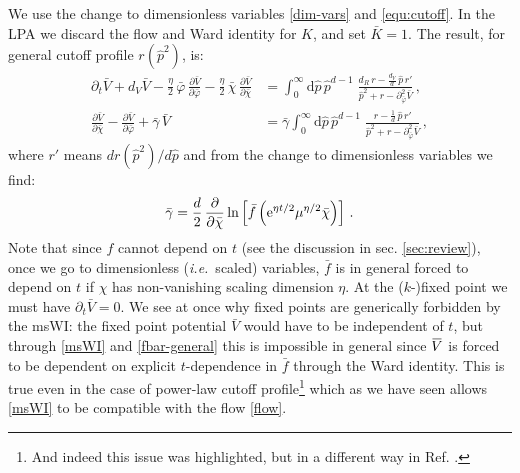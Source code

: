 \documentclass[11pt]{book}
\newcommand{\overbar}[1]{\mkern 1.5mu\overline{\mkern-1.5mu#1\mkern-1.5mu}\mkern 1.5mu}
\newcommand{\bV}{\overbar V}
\newcommand\ie{\textit{i.e.}\ }
\newcommand{\bc}{\bar \chi}
\numberwithin{equation}{chapter}
\begin{document}
We use the change to dimensionless variables \eqref{dim-vars} and \eqref{equ:cutoff}.
In the LPA we discard the flow and Ward identity for $K$, and set $\bar K=1$.
The result, for general cutoff profile $r(\hat{p}^2)$, is:
\begin{align}
  \label{flow}
  \partial_t \bar V + d_V \bar V - \frac{\eta}{2} \, \bar\varphi \, \frac{\partial \bar V}{\partial \bar\varphi} - \frac{\eta}{2} \, \bar\chi \, \frac{\partial \bar V}{\partial \bar\chi} &=
  \int_0^{\infty} \mathrm d\hat p \, \hat p^{d-1} \; \frac{d_R\, r - \frac{d_V}{d} \, \hat p \, r'}{\hat p^2 + r - \partial^2_{\bar\varphi}\bar V}\,,\\
  \label{msWI}
  \frac{\partial \bar V}{\partial \bar\chi} - \frac{\partial \bar V}{\partial \bar\varphi} + \bar \gamma \, \bar V &= \bar \gamma
  \int_0^{\infty} \mathrm d\hat p \, \hat p^{d-1} \; \frac{r - \frac{1}{d} \, \hat p \, r'}{\hat p^2 + r - \partial^2_{\bar\varphi}\bar V} \,,
\end{align}
where $r'$ means $dr(\hat{p}^2)/d\hat{p}$ and from the change to dimensionless variables we find:
\begin{align}
  \label{fbar-general}
  \bar{\gamma} = \frac{d}{2} \, \frac{\partial}{\partial\bc}\ln
  \left[
    \bar{f}\left({\rm e}^{\eta t/2}\mu^{\eta/2}\bc\right)
  \right]\,.
\end{align}
Note that since $f$ cannot depend on $t$ (see the discussion in sec. \ref{sec:review}),
once we go to dimensionless (\ie scaled) variables, $\bar{f}$ is in general forced to depend on
$t$ if $\chi$ has non-vanishing scaling dimension $\eta$.
At the ($k$-)fixed point we must have $\partial_t \bar V = 0$. We see at once why fixed points are
generically forbidden by the msWI: the fixed point potential $\bar{V}$ would have to be independent of $t$,
but through \eqref{msWI} and \eqref{fbar-general} this is impossible in general since $\bV$ is forced
to be dependent on explicit $t$-dependence in $\bar{f}$ through the Ward identity.
This is true even in the case of power-law cutoff profile\footnote{And indeed this issue was highlighted,
but in a different way in Ref. \cite{Dietz:2015owa}.} which as we have seen allows \eqref{msWI} to be
compatible with the flow \eqref{flow}.
\end{document}
